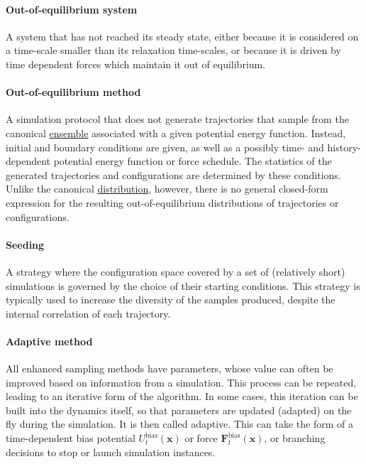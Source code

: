 \documentclass[9pt,review]{livecoms}
\newcommand{\vx}{\mathbf{x}}
\newcommand{\vF}{\mathbf{F}}
\begin{document}
\paragraph{Out-of-equilibrium system} A system that has not reached its steady state, either because it is considered on a time-scale smaller than its relaxation time-scales, or because it is driven by time dependent forces which maintain it out of equilibrium.

\hypertarget{ref:OutOfEq} {\paragraph{Out-of-equilibrium method}}
A simulation protocol that does not generate trajectories that sample from the canonical \hyperlink{ref:Ensemble} {ensemble} associated with a given potential energy function.
Instead, initial and boundary conditions are given, as well as a possibly time- and history-dependent potential energy function or force schedule. The statistics of the generated trajectories and configurations are determined by these conditions.
Unlike the canonical \hyperlink{ref:Distribution} {distribution}, however, there is no general closed-form expression for the resulting out-of-equilibrium distributions of trajectories or configurations.

\hypertarget{ref:Seeding} {\paragraph{Seeding}}
A strategy where the configuration space covered by a set of (relatively short) simulations is governed by the choice of their starting conditions. This strategy is typically used to increase the diversity of the samples produced, despite the internal correlation of each trajectory.


\hypertarget{ref:Adaptive} {\paragraph{Adaptive method}}

All enhanced sampling methods have parameters, whose value can often be improved based on information from a simulation.
This process can be repeated, leading to an iterative form of the algorithm.
In some cases, this iteration can be built into the dynamics itself, so that parameters are updated (adapted) on the fly during the simulation. It is then called adaptive.
This can take the form of a time-dependent bias potential $U^\mathrm{bias}_t(\vx)$ or force $\vF^\mathrm{bias}_t(\vx)$, or branching decisions to stop or launch simulation instances.
\end{document}
